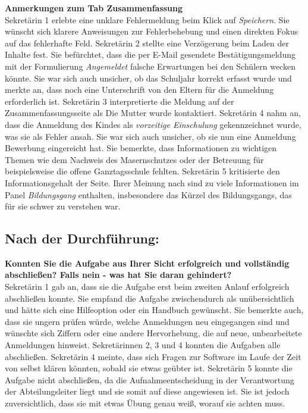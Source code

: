 \textbf{Anmerkungen zum Tab \glqq Zusammenfassung\grqq{}}\\
Sekretärin 1 erlebte eine unklare Fehlermeldung beim Klick auf \textit{Speichern}. Sie wünscht sich klarere Anweisungen zur Fehlerbehebung und einen direkten Fokus auf das fehlerhafte Feld.
Sekretärin 2 stellte eine Verzögerung beim Laden der Inhalte fest. Sie befürchtet, dass die per E-Mail gesendete Bestätigungsmeldung mit der Formulierung \textit{Angemeldet} falsche Erwartungen bei den Schülern wecken könnte. Sie war sich auch unsicher, ob das Schuljahr korrekt erfasst wurde und merkte an, dass noch eine Unterschrift von den Eltern für die Anmeldung erforderlich ist.
Sekretärin 3 interpretierte die Meldung auf der Zusammenfassungsseite als \glqq Die Mutter wurde kontaktiert\grqq{}.
Sekretärin 4 nahm an, dass die Anmeldung des Kindes als \textit{vorzeitige Einschulung} gekennzeichnet wurde, was sie als Fehler ansah. Sie war sich auch unsicher, ob sie nun eine \glqq Anmeldung Bewerbung\grqq{} eingereicht hat. Sie bemerkte, dass Informationen zu wichtigen Themen wie dem Nachweis des Masernschutzes oder der Betreuung für beispielsweise die offene Ganztagsschule fehlten.
Sekretärin 5 kritisierte den Informationsgehalt der Seite. Ihrer Meinung nach sind zu viele Informationen im Panel \textit{Bildungsgang} enthalten, insbesondere das Kürzel des Bildungsgangs, das für sie schwer zu verstehen war.

\subsection{Nach der Durchführung:}

\textbf{Konnten Sie die Aufgabe aus Ihrer Sicht erfolgreich und vollständig abschließen? Falls nein - was hat Sie daran gehindert?}\\
Sekretärin 1 gab an, dass sie die Aufgabe erst beim zweiten Anlauf erfolgreich abschließen konnte. Sie empfand die Aufgabe zwischendurch als unübersichtlich und hätte sich eine Hilfeoption oder ein Handbuch gewünscht. Sie bemerkte auch, dass sie ungern prüfen würde, welche Anmeldungen neu eingegangen sind und wünschte sich Ziffern oder eine andere Hervorhebung, die auf neue, unbearbeitete Anmeldungen hinweist.
Sekretärinnen 2, 3 und 4 konnten die Aufgaben alle abschließen. Sekretärin 4 meinte, dass sich Fragen zur Software im Laufe der Zeit von selbst klären könnten, sobald sie etwas geübter ist.
Sekretärin 5 konnte die Aufgabe nicht abschließen, da die Aufnahmeentscheidung in der Verantwortung der Abteilungsleiter liegt und sie somit auf diese angewiesen ist. Sie ist jedoch zuversichtlich, dass sie mit etwas Übung genau weiß, worauf sie achten muss.

